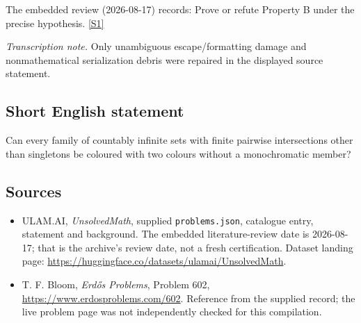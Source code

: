 \documentclass[11pt,a4paper]{article}
\newcommand{\sref}[2]{\hyperlink{source:#1:#2}{[S#2]}}
\begin{document}
The embedded review (2026-08-17) records: Prove or refute Property B under the precise hypothesis. \sref{statement}{1}

{\small\emph{Transcription note.} Only unambiguous escape/formatting damage and nonmathematical serialization debris were repaired in the displayed source statement.}

\subsection{Short English statement}

Can every family of countably infinite sets with finite pairwise intersections other than singletons be coloured with two colours without a monochromatic member?

\subsection{Sources}

{\small

\begin{itemize}

\item[\hypertarget{source:statement:1}{S1}] ULAM.AI, \emph{UnsolvedMath}, supplied \texttt{problems.json}, catalogue entry, statement and background. The embedded literature-review date is 2026-08-17; that is the archive’s review date, not a fresh certification. Dataset landing page: \url{https://huggingface.co/datasets/ulamai/UnsolvedMath}.

\item[\hypertarget{source:statement:2}{S2}] T. F. Bloom, \emph{Erdős Problems}, Problem 602, \url{https://www.erdosproblems.com/602}. Reference from the supplied record; the live problem page was not independently checked for this compilation.

\end{itemize}

}

\label{end:statement}
\end{document}
